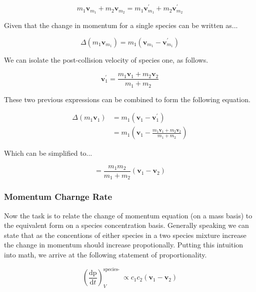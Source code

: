 \documentclass[lettersize,journal]{IEEEtran}
\begin{document}
\begin{equation}
  m_{1} \mathbf{v}_{m_{1}}+m_{2} \mathbf{v}_{m_{2}}=m_{1} \mathbf{v}_{m_{1}}^{\prime}+m_{2} \mathbf{v}_{m_{2}}^{\prime}
\end{equation}

Given that the change in momentum for a single species can be written as...

\begin{equation}
  \Delta\left(m_{1} \mathbf{v}_{m_{1}}\right)=m_{1}\left(\mathbf{v}_{m_{1}}-\mathbf{v}_{m_{1}}^{\prime}\right)
\end{equation}

We can isolate the post-collision velocity of species one, as follows.

\begin{equation}
  \mathbf{v}_{1}^{\prime}=\frac{m_{1} \mathbf{v}_{1}+m_{2} \mathbf{v}_{2}}{m_{1}+m_{2}}
\end{equation}

These two previous expressions can be combined to form the following equation.

\begin{equation}
  \begin{aligned}
  \Delta\left(m_{1} \mathbf{v}_{1}\right) &=m_{1}\left(\mathbf{v}_{1}-\mathbf{v}_{1}^{\prime}\right) \\
  &=m_{1}\left(\mathbf{v}_{1}-\frac{m_{1} \mathbf{v}_{1}+m_{2} \mathbf{v}_{2}}{m_{1}+m_{2}}\right)
  \end{aligned}
\end{equation}

Which can be simplified to...

\begin{equation}
  =\frac{m_{1} m_{2}}{m_{1}+m_{2}}\left(\mathbf{v}_{1}-\mathbf{v}_{2}\right)
\end{equation}

\subsubsection{Momentum Charnge Rate}
Now the task is to relate the change of momentum equation (on a mass basis) to the equivalent form on a species concentration basis. Generally speaking we can state that as the concentions of either species in a two species mixture increase the change in momentum should increase propotionally. Putting this intuition into math, we arrive at the following statement of proportionality.

\begin{equation}
  \left(\frac{\mathrm{dp}}{\mathrm{d} t}\right)_{V}^{\text {species- }} \propto c_{1} c_{2}\left(\mathbf{v}_{1}-\mathbf{v}_{2}\right)
\end{equation}
\end{document}
